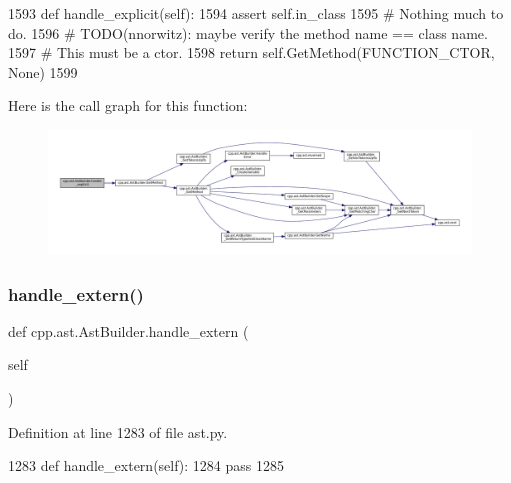 \begin{DoxyCode}
1593     \textcolor{keyword}{def }handle\_explicit(self):
1594         \textcolor{keyword}{assert} self.in\_class
1595         \textcolor{comment}{# Nothing much to do.}
1596         \textcolor{comment}{# TODO(nnorwitz): maybe verify the method name == class name.}
1597         \textcolor{comment}{# This must be a ctor.}
1598         \textcolor{keywordflow}{return} self.GetMethod(FUNCTION\_CTOR, \textcolor{keywordtype}{None})
1599 
\end{DoxyCode}
Here is the call graph for this function\+:
\nopagebreak
\begin{figure}[H]
\begin{center}
\leavevmode
\includegraphics[width=350pt]{classcpp_1_1ast_1_1AstBuilder_a568860050542b53d3df9cf479f2a5e1c_cgraph}
\end{center}
\end{figure}
\mbox{\label{classcpp_1_1ast_1_1AstBuilder_a49039750d971240a270606f0608c1ff0}} 
\subsubsection{\texorpdfstring{handle\+\_\+extern()}{handle\_extern()}}
{\footnotesize\ttfamily def cpp.\+ast.\+Ast\+Builder.\+handle\+\_\+extern (\begin{DoxyParamCaption}\item[{}]{self }\end{DoxyParamCaption})}



Definition at line 1283 of file ast.\+py.


\begin{DoxyCode}
1283     \textcolor{keyword}{def }handle\_extern(self):
1284         \textcolor{keywordflow}{pass}
1285 
\end{DoxyCode}
\mbox{\label{classcpp_1_1ast_1_1AstBuilder_afe125e384026baf74b55593b254fc10c}} 
